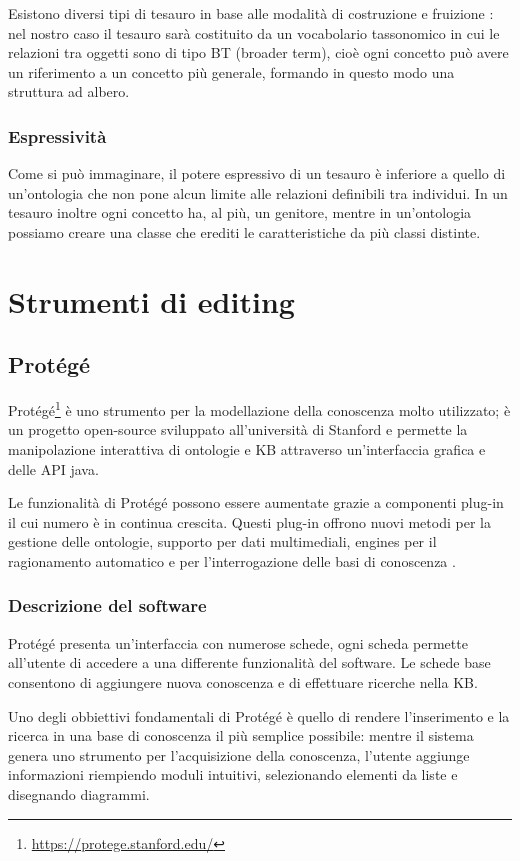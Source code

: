 Esistono diversi tipi di tesauro in base alle modalità di costruzione e fruizione \cite{kilgarriff2000s}: nel nostro caso il tesauro sarà costituito da un vocabolario tassonomico in cui le relazioni tra oggetti sono di tipo BT (broader term), cioè ogni concetto può avere un riferimento a un concetto più generale, formando in questo modo una struttura ad albero. 
\subsubsection{Espressività}
Come si può immaginare, il potere espressivo di un tesauro è inferiore a quello di un'ontologia che non pone alcun limite alle relazioni definibili tra individui. In un tesauro inoltre ogni concetto ha, al più, un genitore, mentre in un'ontologia possiamo creare una classe che erediti le caratteristiche da più classi distinte.
\section{Strumenti di editing}

\subsection{Protégé}
Protégé\footnote{\url{https://protege.stanford.edu/}} è uno strumento per la modellazione della conoscenza molto utilizzato; è un progetto open-source sviluppato all'università di Stanford e permette la manipolazione interattiva di ontologie e KB attraverso un'interfaccia grafica e delle API java.

Le funzionalità di Protégé possono essere aumentate grazie a componenti plug-in il cui numero è in continua crescita. Questi plug-in offrono nuovi metodi per la gestione delle ontologie, supporto per dati multimediali, engines per il ragionamento automatico e per l'interrogazione delle basi di conoscenza \cite{sivakumar2011ontology}.
\subsubsection{Descrizione del software}
Protégé presenta un'interfaccia con numerose schede, ogni scheda permette all'utente di accedere a una differente funzionalità del software. Le schede base consentono di aggiungere nuova conoscenza e di effettuare ricerche nella KB.

Uno degli obbiettivi fondamentali di Protégé è quello di rendere l'inserimento e la ricerca in una base di conoscenza il più semplice possibile: mentre il sistema genera uno strumento per l'acquisizione della conoscenza, l'utente aggiunge informazioni riempiendo moduli intuitivi, selezionando elementi da liste e disegnando diagrammi.


